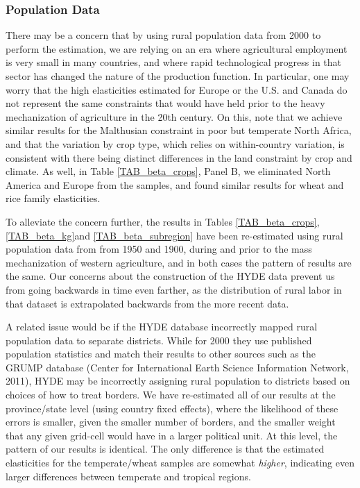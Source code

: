 \documentclass[11pt]{article}
\begin{document}
\subsubsection{Population Data} 
There may be a concern that by using rural population data from 2000 to perform the estimation, we are relying on an era where agricultural employment is very small in many countries, and where rapid technological progress in that sector has changed the nature of the production function. In particular, one may worry that the high elasticities estimated for Europe or the U.S. and Canada do not represent the same constraints that would have held prior to the heavy mechanization of agriculture in the 20th century. On this, note that we achieve similar results for the Malthusian constraint in poor but temperate North Africa, and that the variation by crop type, which relies on within-country variation, is consistent with there being distinct differences in the land constraint by crop and climate. As well, in Table \ref{TAB_beta_crops}, Panel B, we eliminated North America and Europe from the samples, and found similar results for wheat and rice family elasticities.

To alleviate the concern further, the results in Tables \ref{TAB_beta_crops}, \ref{TAB_beta_kg}and \ref{TAB_beta_subregion} have been re-estimated using rural population data from \citet{hyde31} from 1950 and 1900, during and prior to the mass mechanization of western agriculture, and in both cases the pattern of results are the same. Our concerns about the construction of the HYDE data prevent us from going backwards in time even farther, as the distribution of rural labor in that dataset is extrapolated backwards from the more recent data.

A related issue would be if the HYDE database incorrectly mapped rural population data to separate districts. While for 2000 they use published population statistics and match their results to other sources such as the GRUMP database \nocite{GRUMP} (Center for International Earth Science Information Network, 2011), HYDE may be incorrectly assigning rural population to districts based on choices of how to treat borders. We have re-estimated all of our results at the province/state level (using country fixed effects), where the likelihood of these errors is smaller, given the smaller number of borders, and the smaller weight that any given grid-cell would have in a larger political unit. At this level, the pattern of our results is identical. The only difference is that the estimated elasticities for the temperate/wheat samples are somewhat \textit{higher}, indicating even larger differences between temperate and tropical regions.
\end{document}
